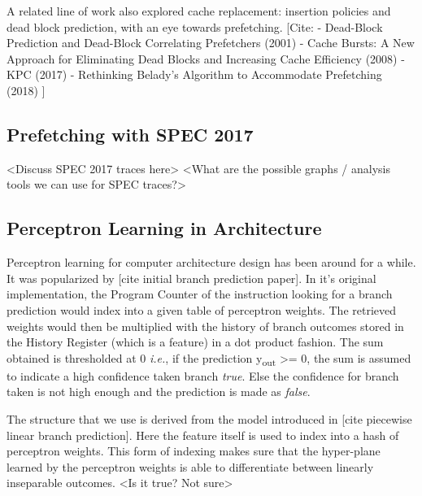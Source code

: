 \documentclass{sig-alternate}
\begin{document}
A related line of work also explored cache replacement: insertion policies and dead block prediction, with an eye towards prefetching. [Cite:\newline
- Dead-Block Prediction and Dead-Block Correlating Prefetchers (2001)\newline
- Cache Bursts: A New Approach for Eliminating Dead Blocks and Increasing Cache Efficiency (2008)\newline
- KPC (2017)\newline
- Rethinking Belady's Algorithm to Accommodate Prefetching (2018)\newline
]

\subsection{Prefetching with SPEC 2017}
<Discuss SPEC 2017 traces here>
<What are the possible graphs / analysis tools we can use for SPEC traces?>

\subsection{Perceptron Learning in Architecture}

Perceptron learning for computer architecture design has been around for a while. 
It was popularized by [cite initial branch prediction paper]. 
In it's original implementation, the Program Counter of the instruction looking for a branch prediction would index into a given table of perceptron weights. 
The retrieved weights would then be multiplied with the history of branch outcomes stored in the History Register (which is a feature) in a dot product fashion. 
The sum obtained is thresholded at 0 \textit{i.e.}, if the prediction y\textsubscript{out} >= 0, the sum is assumed to indicate a  high confidence taken branch \textit{true}. 
Else the confidence for branch taken is not high enough and the prediction is made as \textit{false}.

The structure that we use is derived from the model introduced in [cite piecewise linear branch prediction]. 
Here the feature itself is used to index into a hash of perceptron weights. 
This form of indexing makes sure that the hyper-plane learned by the perceptron weights is able to differentiate between linearly inseparable outcomes. 
<Is it true? Not sure>
\end{document}
